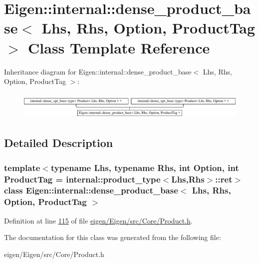 \hypertarget{class_eigen_1_1internal_1_1dense__product__base}{}\section{Eigen\+:\+:internal\+:\+:dense\+\_\+product\+\_\+base$<$ Lhs, Rhs, Option, Product\+Tag $>$ Class Template Reference}
\label{class_eigen_1_1internal_1_1dense__product__base}
Inheritance diagram for Eigen\+:\+:internal\+:\+:dense\+\_\+product\+\_\+base$<$ Lhs, Rhs, Option, Product\+Tag $>$\+:\begin{figure}[H]
\begin{center}
\leavevmode
\includegraphics[height=1.339713cm]{class_eigen_1_1internal_1_1dense__product__base}
\end{center}
\end{figure}


\subsection{Detailed Description}
\subsubsection*{template$<$typename Lhs, typename Rhs, int Option, int Product\+Tag = internal\+::product\+\_\+type$<$\+Lhs,\+Rhs$>$\+::ret$>$\newline
class Eigen\+::internal\+::dense\+\_\+product\+\_\+base$<$ Lhs, Rhs, Option, Product\+Tag $>$}



Definition at line \hyperlink{eigen_2_eigen_2src_2_core_2_product_8h_source_l00115}{115} of file \hyperlink{eigen_2_eigen_2src_2_core_2_product_8h_source}{eigen/\+Eigen/src/\+Core/\+Product.\+h}.



The documentation for this class was generated from the following file\+:\begin{DoxyCompactItemize}
\item 
eigen/\+Eigen/src/\+Core/\+Product.\+h\end{DoxyCompactItemize}
